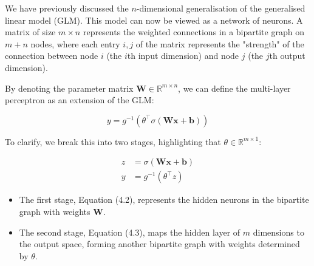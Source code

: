 We have previously discussed the $n$-dimensional generalisation of the generalised linear model (GLM). This model can now be viewed as a network of neurons. A matrix of size $m \times n$ represents the weighted connections in a bipartite graph on $m+n$ nodes, where each entry $i, j$ of the matrix represents the "strength" of the connection between node $i$ (the $i$th input dimension) and node $j$ (the $j$th output dimension).


By denoting the parameter matrix $\bm{W} \in \mathbb{R}^{m \times n}$, we can define the multi-layer perceptron as an extension of the GLM:

\[
    y = g^{-1} \left( \theta^\top \sigma (\bm{W} \bm{x} + \bm{b}) \right) \tag{4.1}
\]

To clarify, we break this into two stages, highlighting that $\theta \in \mathbb{R}^{m \times 1}$:

\begin{align}
    z & = \sigma (\bm{W} \bm{x} + \bm{b}) \tag{4.2}     \\
    y & = g^{-1} \left( \theta^\top z \right) \tag{4.3}
\end{align}

\begin{itemize}
    \item The first stage, Equation (4.2), represents the hidden neurons in the bipartite graph with weights $\bm{W}$.
    \item The second stage, Equation (4.3), maps the hidden layer of $m$ dimensions to the output space, forming another bipartite graph with weights determined by $\theta$.
\end{itemize}


